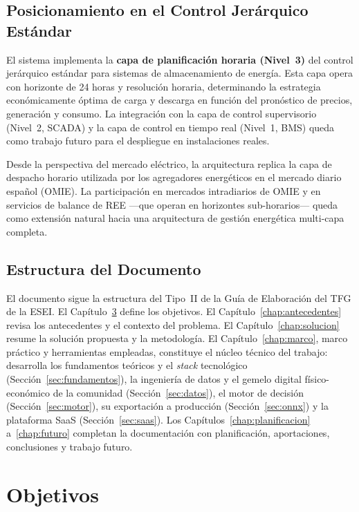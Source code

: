 \documentclass[12pt, a4paper, twoside]{report}
\begin{document}
\section{Posicionamiento en el Control Jerárquico Estándar}

El sistema implementa la \textbf{capa de planificación horaria (Nivel~3)} del
control jerárquico estándar para sistemas de almacenamiento de energía. Esta
capa opera con horizonte de 24 horas y resolución horaria, determinando la
estrategia económicamente óptima de carga y descarga en función del pronóstico
de precios, generación y consumo. La integración con la capa de control
supervisorio (Nivel~2, SCADA) y la capa de control en tiempo real (Nivel~1,
BMS) queda como trabajo futuro para el despliegue en instalaciones reales.

Desde la perspectiva del mercado eléctrico, la arquitectura replica la capa de
despacho horario utilizada por los agregadores energéticos en el mercado diario
español (OMIE). La participación en mercados intradiarios de OMIE y en servicios
de balance de REE —que operan en horizontes sub-horarios— queda como extensión
natural hacia una arquitectura de gestión energética multi-capa completa.

\section{Estructura del Documento}

El documento sigue la estructura del Tipo~II de la Guía de Elaboración del TFG
de la ESEI. El Capítulo~\ref{chap:objetivos} define los objetivos. El
Capítulo~\ref{chap:antecedentes} revisa los antecedentes y el contexto del
problema. El Capítulo~\ref{chap:solucion} resume la solución propuesta y la
metodología. El Capítulo~\ref{chap:marco}, marco práctico y herramientas
empleadas, constituye el núcleo técnico del trabajo: desarrolla los fundamentos
teóricos y el \textit{stack} tecnológico (Sección~\ref{sec:fundamentos}), la
ingeniería de datos y el gemelo digital físico-económico de la comunidad
(Sección~\ref{sec:datos}), el motor de decisión (Sección~\ref{sec:motor}), su
exportación a producción (Sección~\ref{sec:onnx}) y la plataforma SaaS
(Sección~\ref{sec:saas}). Los Capítulos~\ref{chap:planificacion}
a~\ref{chap:futuro} completan la documentación con planificación, aportaciones,
conclusiones y trabajo futuro.

\chapter{Objetivos}
\label{chap:objetivos}
\end{document}
